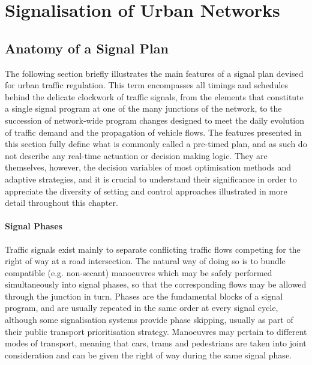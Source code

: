 \chapter{Signalisation of Urban Networks}
\section{Anatomy of a Signal Plan}
The following section briefly illustrates the main features of a signal plan devised for urban traffic regulation. This term encompasses all timings and schedules behind the delicate clockwork of traffic signals, from the elements that constitute a single signal program at one of the many junctions of the network, to the succession of network-wide program changes designed to meet the daily evolution of traffic demand and the propagation of vehicle flows.
The features presented in this section fully define what is commonly called a pre-timed plan, and as such do not describe any real-time actuation or decision making logic.
They are themselves, however, the decision variables of most optimisation methods and adaptive strategies, and it is crucial to understand their significance in order to appreciate the diversity of setting and control approaches illustrated in more detail throughout this chapter.


\subsubsection{Signal Phases}
Traffic signals exist mainly to separate conflicting traffic flows competing for the right of way at a road intersection. The natural way of doing so is to bundle compatible (e.g. non-secant) manoeuvres which may be safely performed simultaneously into signal phases, so that the corresponding flows may be allowed through the junction in turn.
Phases are the fundamental blocks of a signal program, and are usually repeated in the same order at every signal cycle, although some signalisation systems provide phase skipping, usually as part of their public transport prioritisation strategy.
Manoeuvres may pertain to different modes of transport, meaning that cars, trams and
pedestrians are taken into joint consideration and can be given the right of way during the
same signal phase.

